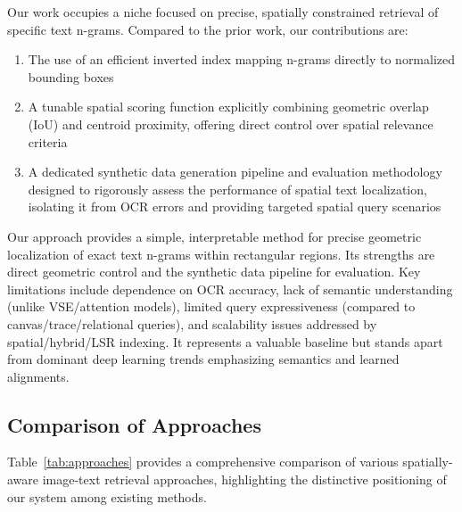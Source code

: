 \documentclass[manuscript,screen]{acmart}
\begin{document}
Our work occupies a niche focused on precise, spatially constrained retrieval of specific text n-grams. Compared to the prior work, our contributions are:

\begin{enumerate}
\item The use of an efficient inverted index mapping n-grams directly to normalized bounding boxes
\item A tunable spatial scoring function explicitly combining geometric overlap (IoU) and centroid proximity, offering direct control over spatial relevance criteria
\item A dedicated synthetic data generation pipeline and evaluation methodology designed to rigorously assess the performance of spatial text localization, isolating it from OCR errors and providing targeted spatial query scenarios
\end{enumerate}

Our approach provides a simple, interpretable method for precise geometric localization of exact text n-grams within rectangular regions. Its strengths are direct geometric control and the synthetic data pipeline for evaluation. Key limitations include dependence on OCR accuracy, lack of semantic understanding (unlike VSE/attention models), limited query expressiveness (compared to canvas/trace/relational queries), and scalability issues addressed by spatial/hybrid/LSR indexing. It represents a valuable baseline but stands apart from dominant deep learning trends emphasizing semantics and learned alignments.

\subsection{Comparison of Approaches}

Table~\ref{tab:approaches} provides a comprehensive comparison of various spatially-aware image-text retrieval approaches, highlighting the distinctive positioning of our system among existing methods.
\end{document}
